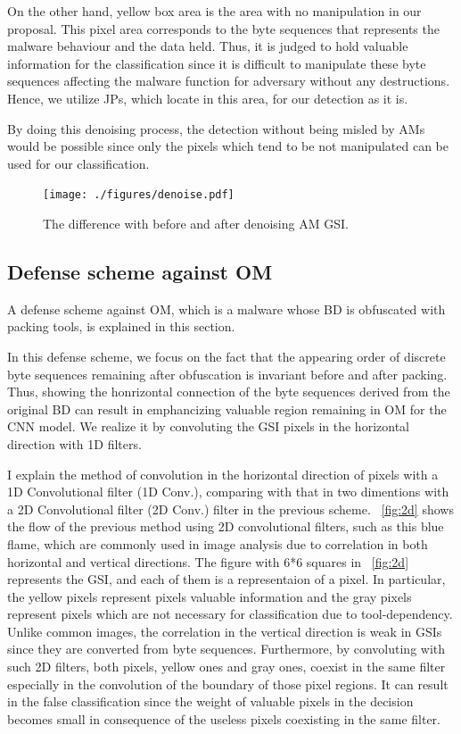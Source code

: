 \documentclass{ieeeaccess}
\begin{document}
On the other hand, yellow box area is the area with no manipulation in our proposal.
This pixel area corresponds to the byte sequences that represents the malware behaviour and the data held.
Thus, it is judged to hold valuable information for the classification since it is difficult to manipulate these byte sequences affecting the malware function for adversary without any destructions.
Hence, we utilize JPs, which locate in this area, for our detection as it is.

By doing this denoising process, the detection without being misled by AMs would be possible since only the pixels which tend to be not manipulated can be used for our classification.

\begin{figure}[h]
 \centering
 \texttt{[image: ./figures/denoise.pdf]}
 \caption{The difference with before and after denoising AM GSI.} 
 \label{fig:denoise}
\end{figure}
\subsection{Defense scheme against OM}
A defense scheme against OM, which is a malware whose BD is obfuscated with packing tools, is explained in this section.

In this defense scheme, we focus on the fact that the appearing order of discrete byte sequences remaining after obfuscation is invariant before and after packing.
Thus, showing the honrizontal connection of the byte sequences derived from the original BD can result in emphancizing valuable region remaining in OM for the CNN model.
We realize it by convoluting the GSI pixels in the horizontal direction with 1D filters.

I explain the method of convolution in the horizontal direction of pixels with a 1D Convolutional filter (1D Conv.), comparing with that in two dimentions with a 2D Convolutional filter (2D Conv.) filter in the previous scheme.
\figurename~\ref{fig:2d} shows the flow of the previous method using 2D convolutional filters, such as this blue flame, which are commonly used in image analysis due to correlation in both horizontal and vertical directions.
The figure with 6*6 squares in \figurename~\ref{fig:2d} represents the GSI, and each of them is a representaion of a pixel.
In particular, the yellow pixels represent pixels valuable information and the gray pixels represent pixels which are not necessary for classification due to tool-dependency.
Unlike common images, the correlation in the vertical direction is weak in GSIs since they are converted from byte sequences.
Furthermore, by convoluting with such 2D filters, both pixels, yellow ones and gray ones, coexist in the same filter especially in the convolution of the boundary of those pixel regions.
It can result in the false classification since the weight of valuable pixels in the decision becomes small in consequence of the useless pixels coexisting in the same filter.
\end{document}
